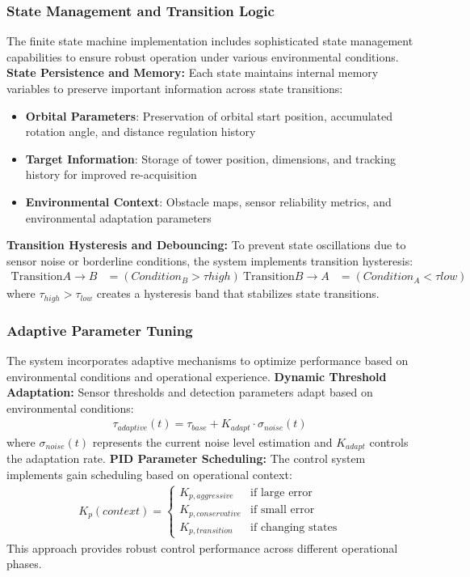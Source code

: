 \subsubsection{State Management and Transition Logic}
The finite state machine implementation includes sophisticated state management capabilities to ensure robust operation under various environmental conditions.
\textbf{State Persistence and Memory:}
Each state maintains internal memory variables to preserve important information across state transitions:
\begin{itemize}
\item \textbf{Orbital Parameters}: Preservation of orbital start position, accumulated rotation angle, and distance regulation history
\item \textbf{Target Information}: Storage of tower position, dimensions, and tracking history for improved re-acquisition
\item \textbf{Environmental Context}: Obstacle maps, sensor reliability metrics, and environmental adaptation parameters
\end{itemize}
\textbf{Transition Hysteresis and Debouncing:} To prevent state oscillations due to sensor noise or borderline conditions, the system implements transition hysteresis: \begin{align} \text{Transition}{A \rightarrow B} &= (Condition_B > \tau{high}) \ \text{Transition}{B \rightarrow A} &= (Condition_A < \tau{low}) \end{align}
where $\tau_{high} > \tau_{low}$ creates a hysteresis band that stabilizes state transitions.
\subsubsection{Adaptive Parameter Tuning}
The system incorporates adaptive mechanisms to optimize performance based on environmental conditions and operational experience.
\textbf{Dynamic Threshold Adaptation:}
Sensor thresholds and detection parameters adapt based on environmental conditions:
\begin{align}
\tau_{adaptive}(t) = \tau_{base} + K_{adapt} \cdot \sigma_{noise}(t)
\end{align}
where $\sigma_{noise}(t)$ represents the current noise level estimation and $K_{adapt}$ controls the adaptation rate.
\textbf{PID Parameter Scheduling:}
The control system implements gain scheduling based on operational context:
\begin{align}
K_p(context) = \begin{cases}
K_{p,aggressive} & \text{if large error} \\
K_{p,conservative} & \text{if small error} \\
K_{p,transition} & \text{if changing states}
\end{cases}
\end{align}
This approach provides robust control performance across different operational phases.

